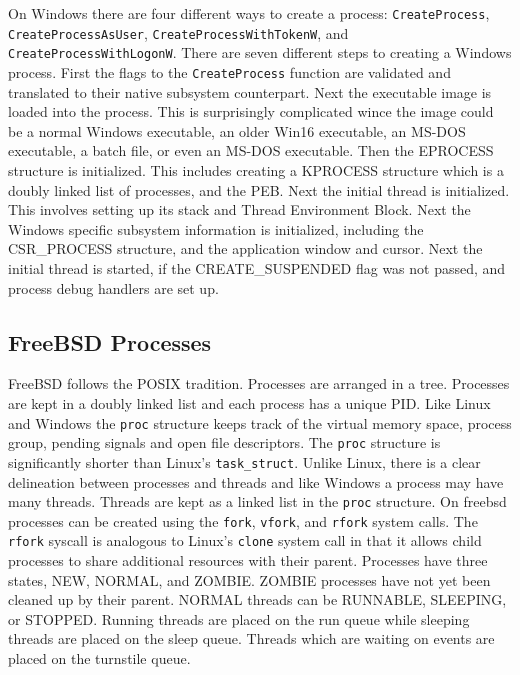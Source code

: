 \documentclass[10pt,conference,draftclsnofoot,onecolumn]{IEEEtran}
\begin{document}
On Windows there are four different ways to create a process: \texttt{CreateProcess}, \texttt{CreateProcessAsUser}, \texttt{CreateProcessWithTokenW}, and \texttt{CreateProcessWithLogonW}. There are seven different steps to creating a Windows process. First the flags to the \texttt{CreateProcess} function are validated and translated to their native subsystem counterpart. Next the executable image is loaded into the process. This is surprisingly complicated wince the image could be a normal Windows executable, an older Win16 executable, an MS-DOS executable, a batch file, or even an MS-DOS executable. Then the EPROCESS structure is initialized. This includes creating a KPROCESS structure which is a doubly linked list of processes, and the PEB. Next the initial thread is initialized. This involves setting up its stack and Thread Environment Block. Next the Windows specific subsystem information is initialized, including the CSR\_PROCESS structure, and the application window and cursor. Next the initial thread is started, if the CREATE\_SUSPENDED flag was not passed, and process debug handlers are set up\cite{2_russinovich_solomon_ionescu_2012}.

\subsection{FreeBSD Processes}
FreeBSD follows the POSIX tradition. Processes are arranged in a tree. Processes are kept in a doubly linked list and each process has a unique PID. Like Linux and Windows the \texttt{proc} structure keeps track of the virtual memory space, process group, pending signals and open file descriptors. The \texttt{proc} structure is significantly shorter than Linux's \texttt{task\_struct}. Unlike Linux, there is a clear delineation between processes and threads and like Windows a process may have many threads. Threads are kept as a linked list in the \texttt{proc} structure. On freebsd processes can be created using the \texttt{fork}, \texttt{vfork}, and \texttt{rfork} system calls. The \texttt{rfork} syscall is analogous to Linux's \texttt{clone} system call in that it allows child processes to share additional resources with their parent. Processes have three states, NEW, NORMAL, and ZOMBIE. ZOMBIE processes have not yet been cleaned up by their parent. NORMAL threads can be RUNNABLE, SLEEPING, or STOPPED. Running threads are placed on the run queue while sleeping threads are placed on the sleep queue. Threads which are waiting on events are placed on the turnstile queue\cite{3_mckusick_neville-neil_watson_2015}.
\end{document}
